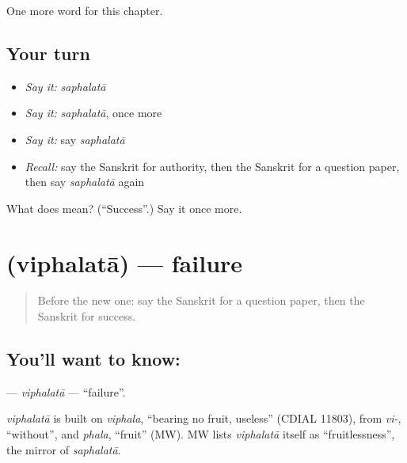 \begin{grammarlens}[title={What you've built}]
One more word for this chapter.
\end{grammarlens}

\subsection*{Your turn}
\begin{itemize}
\raggedright
  \item \emph{Say it:} \emph{saphalatā}
  \item \emph{Say it:} \emph{saphalatā}, once more
  \item \emph{Say it:} say \emph{saphalatā}
  \item \emph{Recall:} say the Sanskrit for authority, then the Sanskrit for a question paper, then say \emph{saphalatā} again
\end{itemize}

\begin{tcolorbox}[breakable,colback=teal!4,colframe=teal!35!black,title={Before you move on}]
What does  mean? (\textquotedblleft{}Success\textquotedblright{}.) Say it once more.
\end{tcolorbox}
\section[\texorpdfstring{\sk{विफलता} (viphalatā)}{विफलता (viphalatā)}]{ (viphalatā) — failure}

\label{lesson:SA-C230-viphalata}



\begin{quote}
Before the new one: say the Sanskrit for a question paper, then the Sanskrit for success.
\end{quote}

\subsection*{You'll want to know: }
\textbf{} — \emph{viphalatā} — \textquotedblleft{}failure\textquotedblright{}.

\begin{cousinweb}
\emph{viphalatā} is built on \emph{viphala}, \textquotedblleft{}bearing no fruit, useless\textquotedblright{} (CDIAL 11803), from \emph{vi-}, \textquotedblleft{}without\textquotedblright{}, and \emph{phala}, \textquotedblleft{}fruit\textquotedblright{} (MW). MW lists \emph{viphalatā} itself as \textquotedblleft{}fruitlessness\textquotedblright{}, the mirror of \emph{saphalatā}.
\end{cousinweb}

